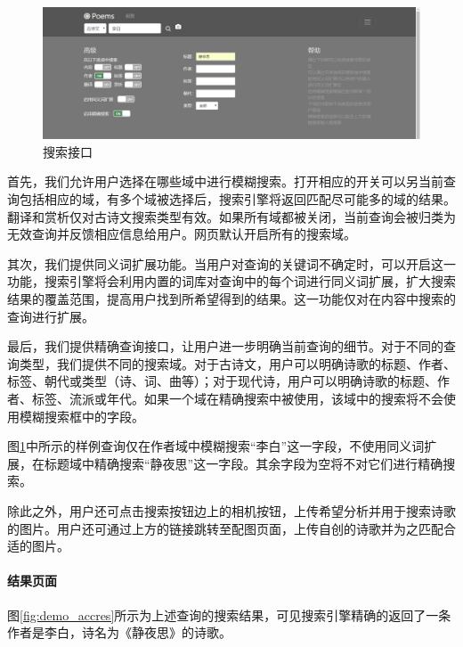 \documentclass[a4paper, 10pt]{article}
\begin{document}
\begin{figure}[H]
\centering
\includegraphics[scale=0.5]{fig/demo_searchbar.png}
\caption{搜索接口}
\label{fig:demo_searchbar}
\end{figure}

首先，我们允许用户选择在哪些域中进行模糊搜索。打开相应的开关可以另当前查询包括相应的域，有多个域被选择后，搜索引擎将返回匹配尽可能多的域的结果。翻译和赏析仅对古诗文搜索类型有效。如果所有域都被关闭，当前查询会被归类为无效查询并反馈相应信息给用户。网页默认开启所有的搜索域。

其次，我们提供同义词扩展功能。当用户对查询的关键词不确定时，可以开启这一功能，搜索引擎将会利用内置的词库对查询中的每个词进行同义词扩展，扩大搜索结果的覆盖范围，提高用户找到所希望得到的结果。这一功能仅对在内容中搜索的查询进行扩展。

最后，我们提供精确查询接口，让用户进一步明确当前查询的细节。对于不同的查询类型，我们提供不同的搜索域。对于古诗文，用户可以明确诗歌的标题、作者、标签、朝代或类型（诗、词、曲等）；对于现代诗，用户可以明确诗歌的标题、作者、标签、流派或年代。如果一个域在精确搜索中被使用，该域中的搜索将不会使用模糊搜索框中的字段。

图\ref{fig:demo_searchbar}中所示的样例查询仅在作者域中模糊搜索“李白”这一字段，不使用同义词扩展，在标题域中精确搜索“静夜思”这一字段。其余字段为空将不对它们进行精确搜索。

除此之外，用户还可点击搜索按钮边上的相机按钮，上传希望分析并用于搜索诗歌的图片。用户还可通过上方的链接跳转至配图页面，上传自创的诗歌并为之匹配合适的图片。


\paragraph*{结果页面} 图\ref{fig:demo_accres}所示为上述查询的搜索结果，可见搜索引擎精确的返回了一条作者是李白，诗名为《静夜思》的诗歌。
\end{document}
